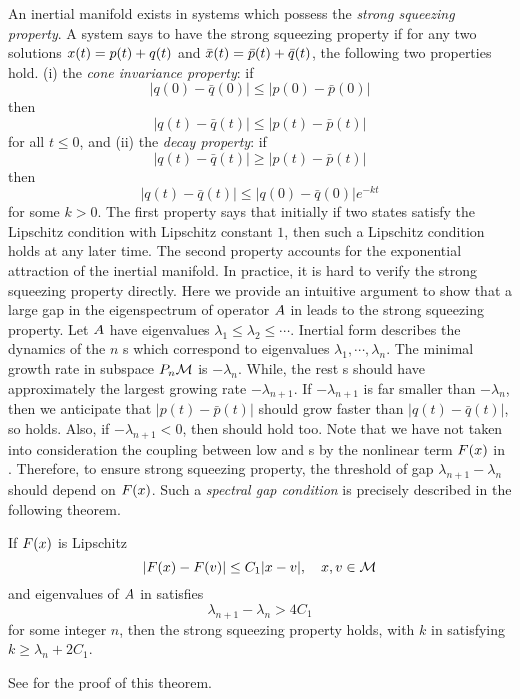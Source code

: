 An inertial manifold exists in systems which possess the
\emph{strong squeezing property}. A system says to have the
strong squeezing property if for any two solutions
$x(t) = p(t) + q(t)$ and $\bar{x}(t) =  \bar{p}(t) + \bar{q}(t)$, the following
two properties hold. (i) the \emph{cone invariance property}: if
\begin{equation}
  \label{eq:ssp1}
  |q(0) - \bar{q}(0)| \le |p(0) - \bar{p}(0)|
\end{equation}
then
\begin{equation}
  \label{eq:ssp2}
  |q(t) - \bar{q}(t)| \le |p(t) - \bar{p}(t)|
\end{equation}
for all $t \le 0$, and (ii) the \emph{decay property}: if
\begin{equation}
  \label{eq:ssp3}
  |q(t) - \bar{q}(t)| \ge |p(t) - \bar{p}(t)|
\end{equation}
then
\begin{equation}
  \label{eq:ssp4}
  |q(t) - \bar{q}(t)| \le |q(0) - \bar{q}(0)| e^{-kt}
\end{equation}
for some $k > 0$. The first property says that initially if two states
satisfy the Lipschitz condition with Lipschitz constant $1$, then
such a Lipschitz condition holds at any later time.
The second property accounts for the exponential attraction 
of the inertial manifold.
In practice, it is hard to verify the strong squeezing property
directly. Here we provide an intuitive argument to
show that a large gap in the eigenspectrum of operator $A$ in 
leads to the strong squeezing property. Let $A$ have eigenvalues
$\lambda_1 \le \lambda_2 \le \cdots$. Inertial form
 describes the dynamics of the $n$ \lowmode s
which correspond to eigenvalues $\lambda_1,\cdots, \lambda_n$.
The minimal growth rate in subspace $P_n\mathcal{M}$ is $-\lambda_n$. While, the rest
\highmode s should have approximately the largest growing rate $-\lambda_{n+1}$. If
$-\lambda_{n+1}$ is far smaller than $-\lambda_n$, then we anticipate that
$|p(t)-\bar{p}(t)|$ should grow faster than $|q(t)-\bar{q}(t)|$, so
 holds.
Also, if $-\lambda_{n+1} < 0$, then
 should hold too. Note that we have not taken into consideration the
coupling between low and \highmode s by the nonlinear term
$F{(}x)$ in .
Therefore, to ensure strong squeezing property,
the threshold of gap $\lambda_{n+1}-\lambda_{n}$
should depend on $F{(}x)$. Such a \emph{spectral gap condition}
is precisely described in the following theorem.
\begin{theorem}
  \label{them:spectGap}
  If $F{(}x)$ is Lipschitz
  \[
    |F{(}x) - F{(}v)| \le C_1 |x - v|, \quad x, v \in \mathcal{M}
  \]
  and eigenvalues of $A$ in  satisfies
  \begin{equation}
    \label{eq:im_gap}
    \lambda_{n+1} - \lambda_n > 4 C_1
  \end{equation}
  for some integer $n$, then the strong squeezing property holds, with
  $k$ in  satisfying $k \ge \lambda_n + 2C_1$.
\end{theorem}
See for the proof of this theorem.

